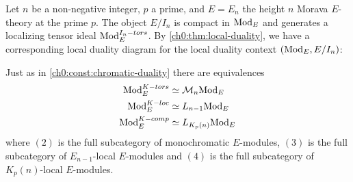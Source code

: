 \begin{construction}
    \label{ch0:const:chromatic-duality-modules}
    Let $n$ be a non-negative integer, $p$ a prime, and $E = E_n$ the height $n$ Morava $E$-theory at the prime $p$. The object $E/I_n$ is compact in $\mathrm{Mod}_{E}$ and generates a localizing tensor ideal $\mathrm{Mod}_{E}^{I_n-tors}$. By \cref{ch0:thm:local-duality}, we have a corresponding local duality diagram for the local duality context $(\mathrm{Mod}_{E}, E/I_n)$:
    \begin{center}
    \end{center}
    Just as in \cref{ch0:const:chromatic-duality} there are equivalences 
    \begin{align}
        \mathrm{Mod}_{E}^{K-tors}&\simeq \mathcal{M}_n\mathrm{Mod}_{E}\\ 
        \mathrm{Mod}_{E}^{K-loc}&\simeq L_{n-1}\mathrm{Mod}_{E}\\
        \mathrm{Mod}_{E}^{K-comp}&\simeq L_{K_p(n)}\mathrm{Mod}_{E}
    \end{align}
    where $(2)$ is the full subcategory of monochromatic $E$-modules, $(3)$ is the full subcategory of $E_{n-1}$-local $E$-modules and $(4)$ is the full subcategory of $K_p(n)$-local $E$-modules. 
\end{construction}

